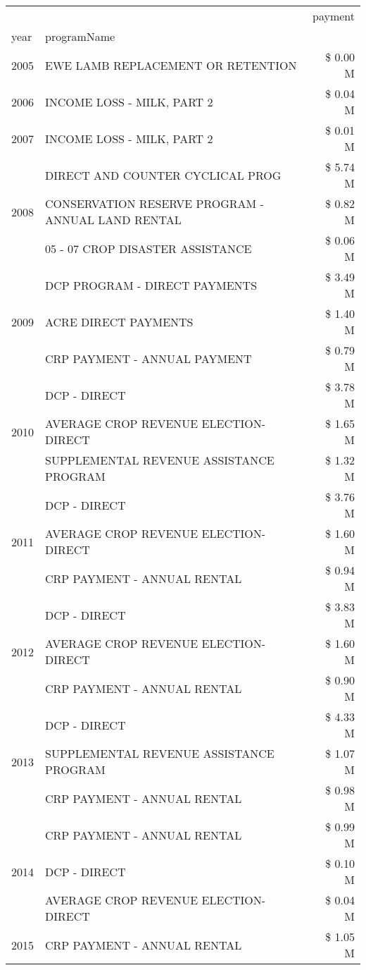 \begin{tabular}{llr}
\toprule
 &  & payment \\
year & programName &  \\
\midrule
2005 & EWE LAMB REPLACEMENT OR RETENTION & \$ 0.00 M \\
\cline{1-3}
2006 & INCOME LOSS - MILK, PART 2 & \$ 0.04 M \\
\cline{1-3}
2007 & INCOME LOSS - MILK, PART 2 & \$ 0.01 M \\
\cline{1-3}
\multirow[t]{3}{*}{2008} & DIRECT AND COUNTER CYCLICAL PROG & \$ 5.74 M \\
 & CONSERVATION RESERVE PROGRAM - ANNUAL LAND RENTAL & \$ 0.82 M \\
 & 05 - 07 CROP DISASTER ASSISTANCE & \$ 0.06 M \\
\cline{1-3}
\multirow[t]{3}{*}{2009} & DCP PROGRAM - DIRECT PAYMENTS & \$ 3.49 M \\
 & ACRE DIRECT PAYMENTS & \$ 1.40 M \\
 & CRP PAYMENT - ANNUAL PAYMENT & \$ 0.79 M \\
\cline{1-3}
\multirow[t]{3}{*}{2010} & DCP - DIRECT & \$ 3.78 M \\
 & AVERAGE CROP REVENUE ELECTION-DIRECT & \$ 1.65 M \\
 & SUPPLEMENTAL REVENUE ASSISTANCE PROGRAM & \$ 1.32 M \\
\cline{1-3}
\multirow[t]{3}{*}{2011} & DCP - DIRECT & \$ 3.76 M \\
 & AVERAGE CROP REVENUE ELECTION-DIRECT & \$ 1.60 M \\
 & CRP PAYMENT - ANNUAL RENTAL & \$ 0.94 M \\
\cline{1-3}
\multirow[t]{3}{*}{2012} & DCP - DIRECT & \$ 3.83 M \\
 & AVERAGE CROP REVENUE ELECTION-DIRECT & \$ 1.60 M \\
 & CRP PAYMENT - ANNUAL RENTAL & \$ 0.90 M \\
\cline{1-3}
\multirow[t]{3}{*}{2013} & DCP - DIRECT & \$ 4.33 M \\
 & SUPPLEMENTAL REVENUE ASSISTANCE PROGRAM & \$ 1.07 M \\
 & CRP PAYMENT - ANNUAL RENTAL & \$ 0.98 M \\
\cline{1-3}
\multirow[t]{3}{*}{2014} & CRP PAYMENT - ANNUAL RENTAL & \$ 0.99 M \\
 & DCP - DIRECT & \$ 0.10 M \\
 & AVERAGE CROP REVENUE ELECTION-DIRECT & \$ 0.04 M \\
\cline{1-3}
\multirow[t]{3}{*}{2015} & CRP PAYMENT - ANNUAL RENTAL & \$ 1.05 M \\

\end{tabular}
